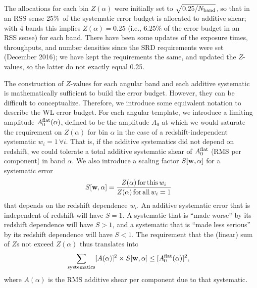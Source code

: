 \documentclass[aps,prd, amsmath,amssymb,superscriptaddress,showkeys,nofootinbib,reprint,preprintnumbers]{revtex4-1}
\begin{document}
The allocations for each bin $Z(\alpha)$ were initially set to $\sqrt{0.25/N_{\rm band}}$, so that in an RSS sense 25\%\ of the systematic error budget is allocated to additive shear; with 4 bands this implies $Z(\alpha)=0.25$ (i.e., 6.25\% of the error budget in an RSS sense) for each band. There have been some updates of the exposure times, throughputs, and number densities since the SRD requirements were set (December 2016); we have kept the requirements the same, and updated the $Z$-values, so the latter do not exactly equal 0.25.

The construction of $Z$-values for each angular band and each additive
systematic is mathematically sufficient to build the error
budget. However, they can be difficult to conceptualize. Therefore, we
introduce some equivalent notation to describe the WL error
budget. For each angular template, we introduce a limiting amplitude
$A_0^{\rm flat}(\alpha)$, defined to be the amplitude $A_0$ at which
we would saturate the requirement on $Z(\alpha)$ for bin $\alpha$ in
the case of a redshift-independent systematic $w_i=1\,\forall i$. That
is, if the additive systematics did not depend on redshift, we could
tolerate a total additive systematic shear of $A_0^{\rm flat}$ (RMS
per component) in band $\alpha$. We also introduce a scaling factor
$S[{\bf w},\alpha]$ for a systematic error
\begin{equation}
S[{\bf w},\alpha] = \frac{Z(\alpha) \,{\rm for\,this\,}w_i}{Z(\alpha)\,{\rm for\,all\,}w_i=1}
\label{eq:Swa}
\end{equation}
that depends on the redshift dependence $w_i$. An additive systematic error that is independent of redshift will have $S=1$. A systematic that is ``made worse'' by its redshift dependence will have $S>1$, and a systematic that is ``made less serious'' by its redshift dependence will have $S<1$. The requirement that the (linear) sum of $Z$s not exceed $Z(\alpha)$ thus translates into
\begin{equation}
\sum_{\rm systematics} [A(\alpha)]^2\times S[{\bf w},\alpha] \le [A_0^{\rm flat}(\alpha)]^2,
\label{eq:A-S-sum}
\end{equation}
where $A(\alpha)$ is the RMS additive shear per component due to that systematic.
\end{document}
